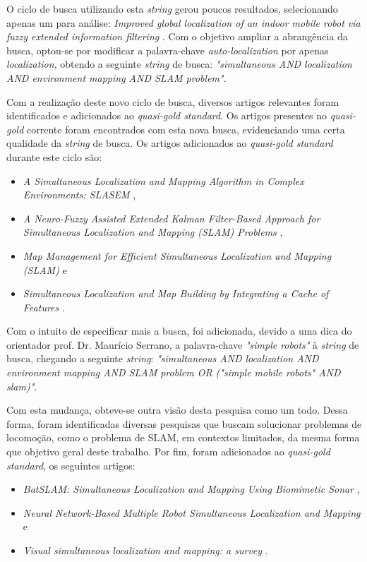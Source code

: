 		O ciclo de busca utilizando esta \textit{string} gerou poucos resultados, selecionando apenas um para análise: \textit{Improved global localization of an indoor mobile robot via fuzzy extended information filtering} \cite{ROB:1764504}. Com o objetivo ampliar a abrangência da busca, optou-se por modificar a palavra-chave \textit{auto-localization} por apenas \textit{localization}, obtendo a seguinte \textit{string} de busca: \textit{"simultaneous AND localization AND environment mapping AND SLAM problem"}.

		Com a realização deste novo ciclo de busca, diversos artigos relevantes foram identificados e adicionados ao \textit{quasi-gold standard}. Os artigos presentes no \textit{quasi-gold} corrente foram encontrados com esta nova busca, evidenciando uma certa qualidade da \textit{string} de busca. Os artigos adicionados ao \textit{quasi-gold standard} durante este ciclo são:

		\begin{itemize}
			\item \textit{A Simultaneous Localization and Mapping Algorithm in Complex Environments: SLASEM} \cite{slasem},
			\item \textit{A Neuro-Fuzzy Assisted Extended Kalman Filter-Based Approach for Simultaneous Localization  and  Mapping (SLAM) Problems} \cite{neurofuzzi},
			\item \textit{Map Management for Efficient Simultaneous Localization and Mapping (SLAM)} \cite{mapManagement} e
			\item \textit{Simultaneous Localization and Map Building by Integrating a Cache of Features} \cite{integratingCacheFeat}.
		\end{itemize}

		Com o intuito de especificar mais a busca, foi adicionada, devido a uma dica do orientador prof. Dr. Maurício Serrano, a palavra-chave \textit{"simple robots"} à \textit{string} de busca, chegando a seguinte \textit{string}: \textit{"simultaneous AND localization AND environment mapping AND SLAM problem OR ("simple mobile robots" AND slam)"}.

		Com esta mudança, obteve-se outra visão desta pesquisa como um todo. Dessa forma, foram identificadas diversas pesquisas que buscam solucionar problemas de locomoção, como o problema de SLAM, em contextos limitados, da mesma forma que objetivo geral deste trabalho. Por fim, foram adicionados ao \textit{quasi-gold standard}, os seguintes artigos:

		\begin{itemize}
			\item \textit{BatSLAM: Simultaneous Localization and Mapping Using Biomimetic Sonar} \cite{batslam},
			\item \textit{Neural Network-Based Multiple Robot Simultaneous Localization and Mapping} \cite{neuralNetwork} e
			\item \textit{Visual simultaneous localization and mapping: a survey} \cite{surveyLocalization}.
		\end{itemize}

